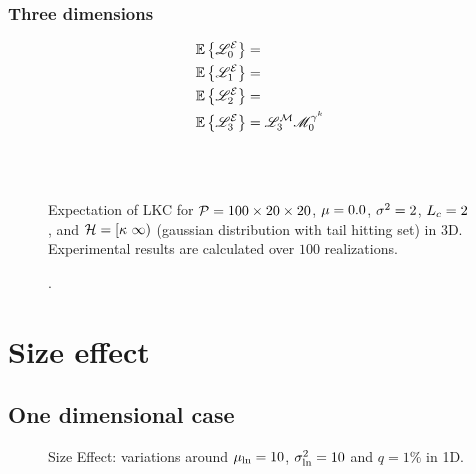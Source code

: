 \documentclass[a4paper,12pt]{article}
\begin{document}
\newpage
\subsubsection{Three dimensions}
\begin{subequations}
\begin{align}
  &\Expec\left\{\LKC_0^\ES\right\} = \\%
  &\Expec\left\{\LKC_1^\ES\right\} = \\%
  &\Expec\left\{\LKC_2^\ES\right\} = \\%
  &\Expec\left\{\LKC_3^\ES\right\} = \LKC_3^\MRF\GMFk_0
\end{align}
\end{subequations}

\begin{figure}[!h]
  \centering
  \subfigure{\scalebox{0.35}{}}\hspace{1.2cm}
  \subfigure{\scalebox{0.35}{}}\\
  \subfigure{\scalebox{0.35}{}}\hspace{1.2cm}
  \subfigure{\scalebox{0.35}{}}\\
  \caption{Expectation of LKC for $\mathcal{P}=100\times 20 \times 20$, $\mu=0.0$, $\sigma^2=2$, $L_c=2$, and $\mathcal{H}=[\kappa\ \infty)$ (gaussian distribution with tail hitting set) in 3D. Experimental results are calculated over $100$ realizations.}
\end{figure}

\begin{figure}[!h]
  \centering
  \subfigure{\scalebox{0.35}{}}\hspace{1.2cm}
  \subfigure{\scalebox{0.35}{}}
  \caption{.}
\end{figure}

\newpage
\section{Size effect}
\subsection{One dimensional case}
\begin{figure}[!h]
  \centering
  \hfill
   \hfill
  \caption{Size Effect: variations around $\mu_{\ln}=10$, $\sigma_{\ln}^2=10$ and $q=1\%$ in 1D.}
\end{figure}
\end{document}

